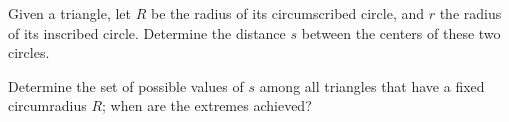 Given a triangle,
let $R$ be the radius of its circumscribed circle,
and $r$ the radius of its inscribed circle.
Determine the distance $s$ between the centers of these two circles.

Determine the set of possible values of $s$
among all triangles that have a fixed circumradius $R$;
when are the extremes achieved?
